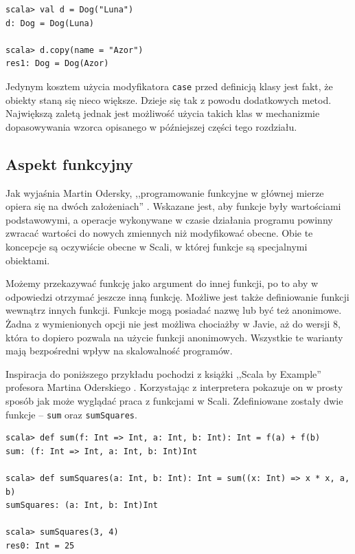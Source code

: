 \documentclass[brudnopis]{xmgr}
\begin{document}
\begin{verbatim}
scala> val d = Dog("Luna")
d: Dog = Dog(Luna)

scala> d.copy(name = "Azor")
res1: Dog = Dog(Azor)
\end{verbatim}

Jedynym kosztem użycia modyfikatora \texttt{case} przed definicją klasy jest fakt, że obiekty staną się nieco większe. Dzieje się tak z powodu dodatkowych metod. Największą zaletą jednak jest możliwość użycia takich klas w mechanizmie dopasowywania wzorca opisanego w późniejszej części tego rozdziału.

\subsection{Aspekt funkcyjny}

Jak wyjaśnia Martin Odersky, ,,programowanie funkcyjne w głównej mierze opiera się na dwóch założeniach'' \cite[s.57]{Odersky:2010:PIS}. Wskazane jest, aby funkcje były wartościami podstawowymi, a operacje wykonywane w czasie działania programu powinny zwracać wartości do nowych zmiennych niż modyfikować obecne. Obie te koncepcje są oczywiście obecne w Scali, w której funkcje są specjalnymi obiektami. 

Możemy przekazywać funkcję jako argument do innej funkcji, po to aby w odpowiedzi otrzymać jeszcze inną funkcję. Możliwe jest także definiowanie funkcji wewnątrz innych funkcji. Funkcje mogą posiadać nazwę lub być też anonimowe. Żadna z wymienionych opcji nie jest możliwa chociażby w Javie, aż do wersji 8, która to dopiero pozwala na użycie funkcji anonimowych. Wszystkie te warianty mają bezpośredni wpływ na skalowalność programów.

Inspiracja do poniższego przykładu pochodzi z książki ,,Scala by Example'' profesora Martina Oderskiego \cite[s. 22]{Odersky:2014:SBE}. Korzystając z interpretera pokazuje on w prosty sposób jak może wyglądać praca z funkcjami w Scali. Zdefiniowane zostały dwie funkcje -- \texttt{sum} oraz \texttt{sumSquares}.

\begin{verbatim}
scala> def sum(f: Int => Int, a: Int, b: Int): Int = f(a) + f(b)
sum: (f: Int => Int, a: Int, b: Int)Int

scala> def sumSquares(a: Int, b: Int): Int = sum((x: Int) => x * x, a, b)
sumSquares: (a: Int, b: Int)Int

scala> sumSquares(3, 4)
res0: Int = 25
\end{verbatim}
\end{document}
